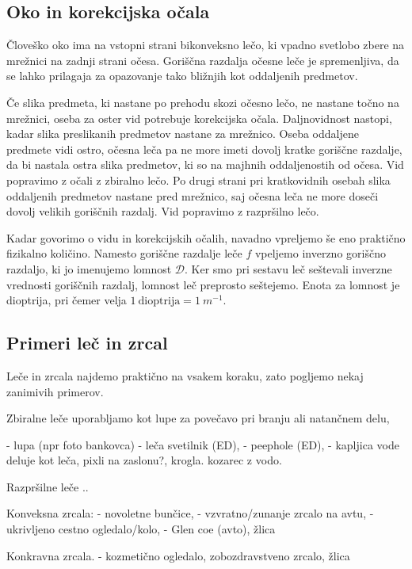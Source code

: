 \subsection*{Oko in korekcijska očala}
Človeško oko ima na vstopni strani bikonveksno lečo, ki vpadno 
svetlobo zbere na mrežnici na zadnji strani očesa. 
Goriščna razdalja očesne leče je spremenljiva, da se lahko 
prilagaja za opazovanje tako bližnjih kot oddaljenih
predmetov. 

Če slika predmeta, ki nastane po prehodu skozi očesno lečo,
ne nastane točno na mrežnici, oseba za oster vid potrebuje korekcijska očala.
Daljnovidnost nastopi, kadar slika preslikanih predmetov nastane
za mrežnico. Oseba oddaljene predmete vidi ostro, očesna leča 
pa ne more imeti dovolj kratke goriščne razdalje, da bi nastala ostra 
slika predmetov, ki so na majhnih oddaljenostih od očesa. Vid popravimo z očali z 
zbiralno lečo. Po drugi strani pri kratkovidnih osebah slika
oddaljenih predmetov nastane pred mrežnico, saj očesna leča 
ne more doseči dovolj velikih goriščnih razdalj. Vid popravimo
z razpršilno lečo. 

\begin{remark}
 Kadar govorimo o vidu in korekcijskih očalih, navadno vpreljemo
 še eno praktično fizikalno količino. Namesto goriščne razdalje
 leče $f$ vpeljemo inverzno goriščno razdaljo, ki jo imenujemo 
 lomnost $\mathcal{D}$. Ker smo pri sestavu leč seštevali inverzne
 vrednosti goriščnih razdalj, lomnost leč preprosto seštejemo. 
 Enota za lomnost je dioptrija, pri čemer velja $1~\mathrm{dioptrija} = 
 1~\si{m}^{-1}$.
\end{remark}

\subsection*{Primeri leč in zrcal}
Leče in zrcala najdemo praktično na vsakem koraku, zato pogljemo nekaj zanimivih 
primerov.

Zbiralne leče uporabljamo kot lupe za povečavo pri branju ali natančnem delu, 


- lupa (npr foto bankovca)
- leča svetilnik (ED), - peephole (ED), - kapljica vode deluje kot leča, pixli na zaslonu?, krogla. kozarec z vodo.

Razpršilne leče ..

Konveksna zrcala: - novoletne bunčice, - vzvratno/zunanje zrcalo na avtu, - ukrivljeno cestno ogledalo/kolo, - Glen coe (avto), žlica

Konkravna zrcala. - kozmetično ogledalo, zobozdravstveno zrcalo, žlica
